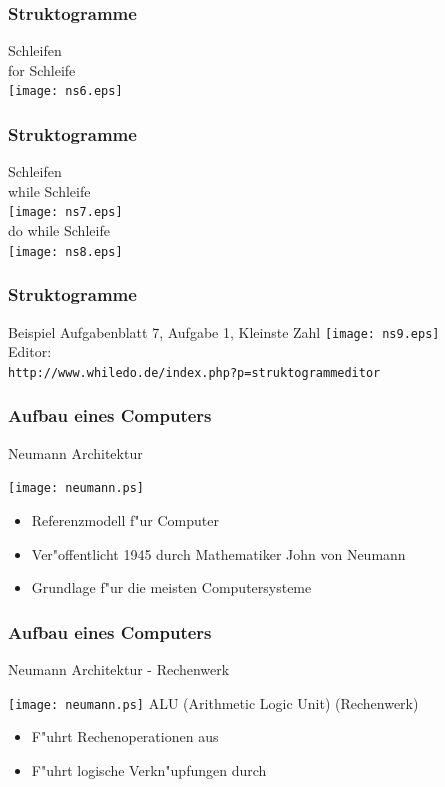 \documentclass{beamer}
\begin{document}
\begin{frame}[fragile]
	\frametitle{Struktogramme}
	Schleifen\\
	for Schleife\\
	\texttt{[image: ns6.eps]}
\end{frame}

\begin{frame}[fragile]
	\frametitle{Struktogramme}
	Schleifen\\
	while Schleife\\
	\texttt{[image: ns7.eps]}\\
	do while Schleife\\
	\texttt{[image: ns8.eps]}
\end{frame}

\begin{frame}[fragile]
	\frametitle{Struktogramme}
	Beispiel Aufgabenblatt 7, Aufgabe 1, Kleinste Zahl
	\texttt{[image: ns9.eps]}\\
	\vspace{5mm}
	Editor:\\
	{\tiny
	\verb|http://www.whiledo.de/index.php?p=struktogrammeditor|
	}
\end{frame}

\frame
{
	\frametitle{Aufbau eines Computers}
	Neumann Architektur\\
	\vspace{3mm}
	\begin{multicols}{2}
	\texttt{[image: neumann.ps]}
	
	\begin{itemize}
	\item Referenzmodell f"ur Computer
	\item Ver"offentlicht 1945 durch Mathematiker John von Neumann
	\item Grundlage f"ur die meisten Computersysteme
	\end{itemize}
	\end{multicols}
}

\frame
{
	\frametitle{Aufbau eines Computers}
	Neumann Architektur - Rechenwerk\\
	\vspace{3mm}
	\begin{multicols}{2}
	\texttt{[image: neumann.ps]}
	ALU (Arithmetic Logic Unit) (Rechenwerk)
	\begin{itemize}
	\item F"uhrt Rechenoperationen aus
	\item F"uhrt logische Verkn"upfungen durch
	\end{itemize}
	\end{multicols}
}
\end{document}
